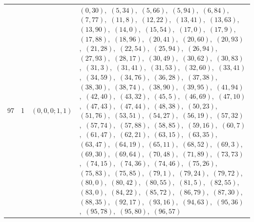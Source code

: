 \documentclass[11pt]{article}
\begin{document}
\begin{longtable}{@{}rrl>{\raggedright\arraybackslash}p{}@{}}
97 & 1 & $(0,0,0;1,1)$ & $(0,30)$,\allowbreak\ $(5,34)$,\allowbreak\ $(5,66)$,\allowbreak\ $(5,94)$,\allowbreak\ $(6,84)$,\allowbreak\ $(7,77)$,\allowbreak\ $(11,8)$,\allowbreak\ $(12,22)$,\allowbreak\ $(13,41)$,\allowbreak\ $(13,63)$,\allowbreak\ $(13,90)$,\allowbreak\ $(14,0)$,\allowbreak\ $(15,54)$,\allowbreak\ $(17,0)$,\allowbreak\ $(17,9)$,\allowbreak\ $(17,88)$,\allowbreak\ $(18,96)$,\allowbreak\ $(20,41)$,\allowbreak\ $(20,60)$,\allowbreak\ $(20,93)$,\allowbreak\ $(21,28)$,\allowbreak\ $(22,54)$,\allowbreak\ $(25,94)$,\allowbreak\ $(26,94)$,\allowbreak\ $(27,93)$,\allowbreak\ $(28,17)$,\allowbreak\ $(30,49)$,\allowbreak\ $(30,62)$,\allowbreak\ $(30,83)$,\allowbreak\ $(31,3)$,\allowbreak\ $(31,41)$,\allowbreak\ $(31,53)$,\allowbreak\ $(32,60)$,\allowbreak\ $(33,41)$,\allowbreak\ $(34,59)$,\allowbreak\ $(34,76)$,\allowbreak\ $(36,28)$,\allowbreak\ $(37,38)$,\allowbreak\ $(38,30)$,\allowbreak\ $(38,74)$,\allowbreak\ $(38,90)$,\allowbreak\ $(39,95)$,\allowbreak\ $(41,94)$,\allowbreak\ $(42,40)$,\allowbreak\ $(43,32)$,\allowbreak\ $(45,5)$,\allowbreak\ $(46,69)$,\allowbreak\ $(47,10)$,\allowbreak\ $(47,43)$,\allowbreak\ $(47,44)$,\allowbreak\ $(48,38)$,\allowbreak\ $(50,23)$,\allowbreak\ $(51,76)$,\allowbreak\ $(53,51)$,\allowbreak\ $(54,27)$,\allowbreak\ $(56,19)$,\allowbreak\ $(57,32)$,\allowbreak\ $(57,74)$,\allowbreak\ $(57,88)$,\allowbreak\ $(58,85)$,\allowbreak\ $(59,16)$,\allowbreak\ $(60,7)$,\allowbreak\ $(61,47)$,\allowbreak\ $(62,21)$,\allowbreak\ $(63,15)$,\allowbreak\ $(63,35)$,\allowbreak\ $(63,47)$,\allowbreak\ $(64,19)$,\allowbreak\ $(65,11)$,\allowbreak\ $(68,52)$,\allowbreak\ $(69,3)$,\allowbreak\ $(69,30)$,\allowbreak\ $(69,64)$,\allowbreak\ $(70,48)$,\allowbreak\ $(71,89)$,\allowbreak\ $(73,73)$,\allowbreak\ $(74,15)$,\allowbreak\ $(74,36)$,\allowbreak\ $(74,46)$,\allowbreak\ $(75,26)$,\allowbreak\ $(75,83)$,\allowbreak\ $(75,85)$,\allowbreak\ $(79,1)$,\allowbreak\ $(79,24)$,\allowbreak\ $(79,72)$,\allowbreak\ $(80,0)$,\allowbreak\ $(80,42)$,\allowbreak\ $(80,55)$,\allowbreak\ $(81,5)$,\allowbreak\ $(82,55)$,\allowbreak\ $(83,0)$,\allowbreak\ $(84,22)$,\allowbreak\ $(85,72)$,\allowbreak\ $(86,79)$,\allowbreak\ $(87,30)$,\allowbreak\ $(88,35)$,\allowbreak\ $(92,17)$,\allowbreak\ $(93,16)$,\allowbreak\ $(94,63)$,\allowbreak\ $(95,36)$,\allowbreak\ $(95,78)$,\allowbreak\ $(95,80)$,\allowbreak\ $(96,57)$\\

\end{longtable}
\end{document}
